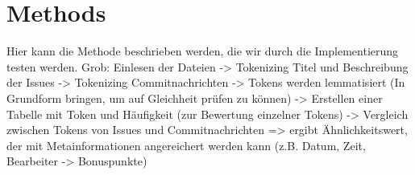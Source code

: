 \section{Methods}
\label{sec:methods}

Hier kann die Methode beschrieben werden, die wir durch die Implementierung testen werden. Grob: Einlesen der Dateien -> Tokenizing Titel und Beschreibung der Issues -> Tokenizing Commitnachrichten -> Tokens werden lemmatisiert (In Grundform bringen, um auf Gleichheit prüfen zu können) -> Erstellen einer Tabelle mit Token und Häufigkeit (zur Bewertung einzelner Tokens) -> Vergleich zwischen Tokens von Issues und Commitnachrichten => ergibt Ähnlichkeitswert, der mit Metainformationen angereichert werden kann (z.B. Datum, Zeit, Bearbeiter -> Bonuspunkte)